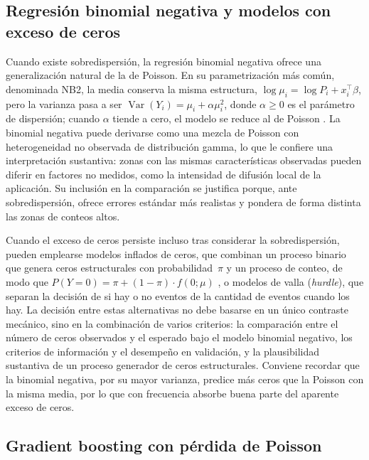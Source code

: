 \subsection{Regresión binomial negativa y modelos con exceso de ceros}
\label{subsec:binomial-negativa}

Cuando existe sobredispersión, la regresión binomial negativa ofrece una generalización
natural de la de Poisson. En su parametrización más común, denominada NB2, la media conserva
la misma estructura, $\log \mu_i = \log P_i + x_i^{\top}\beta$, pero la varianza pasa a ser
$\operatorname{Var}(Y_i) = \mu_i + \alpha \mu_i^2$, donde $\alpha \ge 0$ es el parámetro de
dispersión; cuando $\alpha$ tiende a cero, el modelo se reduce al de Poisson
\parencite{hilbe2011,cameron2013}. La binomial negativa puede derivarse como una mezcla de
Poisson con heterogeneidad no observada de distribución gamma, lo que le confiere una
interpretación sustantiva: zonas con las mismas características observadas pueden diferir en
factores no medidos, como la intensidad de difusión local de la aplicación. Su inclusión en
la comparación se justifica porque, ante sobredispersión, ofrece errores estándar más
realistas y pondera de forma distinta las zonas de conteos altos.

Cuando el exceso de ceros persiste incluso tras considerar la sobredispersión, pueden
emplearse modelos inflados de ceros, que combinan un proceso binario que genera ceros
estructurales con probabilidad~$\pi$ y un proceso de conteo, de modo que
$P(Y = 0) = \pi + (1 - \pi) \cdot f(0; \mu)$ \parencite{lambert1992}, o modelos de valla
(\textit{hurdle}), que separan la decisión de si hay o no eventos de la cantidad de eventos
cuando los hay. La decisión entre estas alternativas no debe basarse en un único contraste
mecánico, sino en la combinación de varios criterios: la comparación entre el número de
ceros observados y el esperado bajo el modelo binomial negativo, los criterios de
información y el desempeño en validación, y la plausibilidad sustantiva de un proceso
generador de ceros estructurales. Conviene recordar que la binomial negativa, por su mayor
varianza, predice más ceros que la Poisson con la misma media, por lo que con frecuencia
absorbe buena parte del aparente exceso de ceros.

\subsection{Gradient boosting con pérdida de Poisson}
\label{subsec:gradient-boosting}

